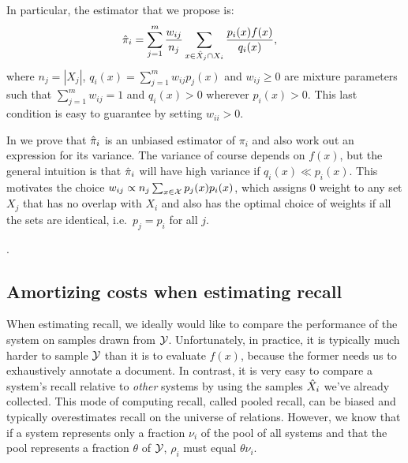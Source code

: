 In particular, the estimator that we propose is:
\begin{align*}
  {\hat{\pi}}_i &= \sum_{j=1}^m \frac{w_{ij}}{n_{j}} \sum_{x \in {\hat{X}}_j \cap X_i} \frac{p_i(x) f(x)}{q_i(x)},
\end{align*}
where $n_{j} = |X_j|$, $q_i(x) = \sum_{j=1}^m w_{ij} p_j(x)$ and $w_{ij} \ge 0$ are mixture parameters such that $\sum_{j=1}^m w_{ij} = 1$ and $q_i(x) > 0$ wherever $p_i(x) > 0$.
This last condition is easy to guarantee by setting $w_{ii} > 0$.

In  we prove that ${\hat{\pi}}_i$ is an unbiased estimator of $\pi_i$ and also work out an expression for its variance. 
The variance of course depends on $f(x)$, but the general intuition is that 
${\hat{\pi}}_i$ will have high variance if $q_i(x) \ll p_i(x)$.
This motivates the choice $w_{ij} \propto n_{j} \sum_{x \in \mathcal{X}} p_j(x) p_i(x)$, which assigns $0$ weight to any set $X_j$ that has no overlap with $X_i$ and also has the optimal choice of weights if all the sets are identical, i.e.\ $p_j = p_i$ for all $j$.

.

\subsection{Amortizing costs when estimating recall}
When estimating recall, we ideally would like to compare the performance of the system on samples drawn from $\mathcal{Y}$.
Unfortunately, in practice, it is typically much harder to sample $\mathcal{Y}$ than it is to evaluate $f(x)$, because the former needs us to exhaustively annotate a document.
In contrast, it is very easy to compare a system's recall relative to \textit{other} systems by using the samples ${\hat{X}}_i$ we've already collected.
This mode of computing recall, called pooled recall, can be biased and typically overestimates recall on the universe of relations.
However, we know that if a system represents only a fraction $\nu_i$ of the pool of all systems and that the pool represents a fraction $\theta$ of $\mathcal{Y}$, $\rho_i$ must equal $\theta \nu_i$.


